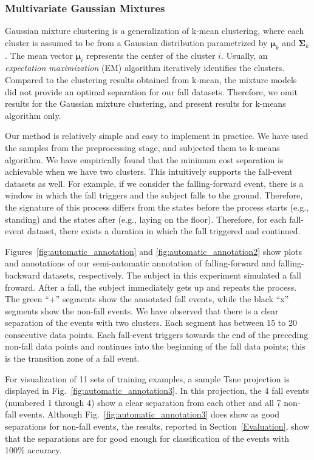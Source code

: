 \documentclass[]{IEEEtran}
\begin{document}
\subsubsection{Multivariate Gaussian Mixtures}
Gaussian mixture clustering is a generalization of k-mean clustering, where
each cluster is assumed to be from a Gaussian distribution parametrized by
$\boldsymbol{\mu}_k$ and $\boldsymbol{\Sigma}_k$. The mean vector
$\boldsymbol{\mu}_i$ represents the center of the cluster $i$.  Usually, an
\emph{expectation maximization} (EM) algorithm iteratively identifies the
clusters. Compared to the clustering results obtained from k-mean, the mixture
models did not provide an optimal separation for our fall datasets. Therefore,
we omit results for the Gaussian mixture clustering, and present results for
k-means algorithm only. 

Our method is relatively simple and easy to implement in practice. We have used
the samples from the preprocessing stage, and subjected them to k-means
algorithm. We have empirically found that the minimum cost separation is
achievable when we have two clusters. This intuitively supports the fall-event
datasets as well. For example, if we consider the falling-forward event, there
is a window in which the fall triggers and the subject falls to the ground.
Therefore, the signature of this process differs from the states before the
process starts (e.g., standing) and the states after (e.g., laying on the
floor). Therefore, for each fall-event dataset, there exists a duration in which the fall
triggered and continued.

Figures~\ref{fig:automatic_annotation} and \ref{fig:automatic_annotation2} show
plots and annotations of our semi-automatic annotation of falling-forward  and
falling-backward datasets, respectively. The subject in this experiment
simulated a fall froward. After a fall, the subject immediately gets up and
repeats the process. The green ``+'' segments show the annotated fall events,
while the black ``x'' segments show the non-fall events. We have observed that
there is a clear separation of the events with two clusters. Each segment has
between 15 to 20 consecutive data points.
Each fall-event triggers towards the end of the preceding non-fall data points
and continues into the beginning of the fall data points; this is the
transition zone of a fall event.

\par For visualization of 11 sets of training examples, a sample Tsne
projection  is displayed in Fig.~\ref{fig:automatic_annotation3}. In this
projection, the 4 fall events (numbered 1 through 4) show a clear separation
from each other and all 7 non-fall events. Although Fig.~\ref{fig:automatic_annotation3} does show as good separations for non-fall events, the results, reported in Section~\ref{Evaluation}, show that the separations are for good enough for classification of the events with 100\%
accuracy.
\end{document}
